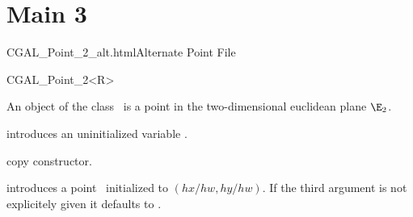 
\chapter{Main 3}

\begin{ccHtmlClassFile}{CGAL_Point_2_alt.html}{Alternate Point File}

\ccHtmlNoClassLinks
\ccHtmlNoClassIndex
\ccHtmlNoClassFile  %



\begin{ccClassTemplate} {CGAL_Point_2<R>}



\ccDefinition
An object of the class \ccClassName\ is a point in the two-dimensional
euclidean plane $\E_2$. 


\ccCreation
{}


\ccHidden {}
             {introduces an uninitialized variable \ccVar.}

\ccHidden {}
            {copy constructor.}

            {introduces a point \ccVar\ initialized to $(hx/hw,hy/hw)$.
             If the third argument is not explicitely given it defaults
             to .}

\end{ccClassTemplate} 

\end{ccHtmlClassFile}



